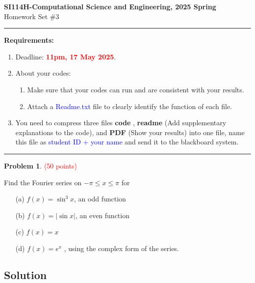 \documentclass[english,onecolumn]{IEEEtran}
\begin{document}
\begin{center}
	\textbf{\LARGE{SI114H-Computational Science and Engineering, 2025 Spring}}\\
	{\Large Homework Set \#3}\\
\par\end{center}

\noindent
\rule{\linewidth}{0.4pt}
{\bf Requirements:}
\begin{enumerate}
	\item Deadline: {\bf \textcolor{red}{11pm, 17 May 2025}}. %

	\item About your codes:
	\begin{enumerate}
	    \item Make sure that your codes can run and are consistent with your results.
	    \item Attach a {\textcolor{blue}{Readme.txt}} file to clearly identify the function of each file.
	\end{enumerate}

 \item You need to compress three files \textbf{code} , \textbf{readme} (Add supplementary explanations to the code), and \textbf{PDF} (Show your results) into one file, name this file as \textcolor{blue}{student ID + your name} and send it to the blackboard system.

\end{enumerate}
\rule{\linewidth}{0.4pt}



\noindent\textbf{Problem 1}. \textcolor{red}{(50 points)} \par
Find the Fourier series on $-\pi \leq x \leq \pi$ for
\begin{itemize}
	\item[(a)] $f(x) = \sin^3x$, an odd function
	\item[(b)] $f(x) = |\sin x |$, an even function
	\item[(c)] $f(x) = x$
	\item[(d)] $f( x) = e^x$ , using the complex form of the series.
\end{itemize}


\subsection{Solution}
\end{document}
